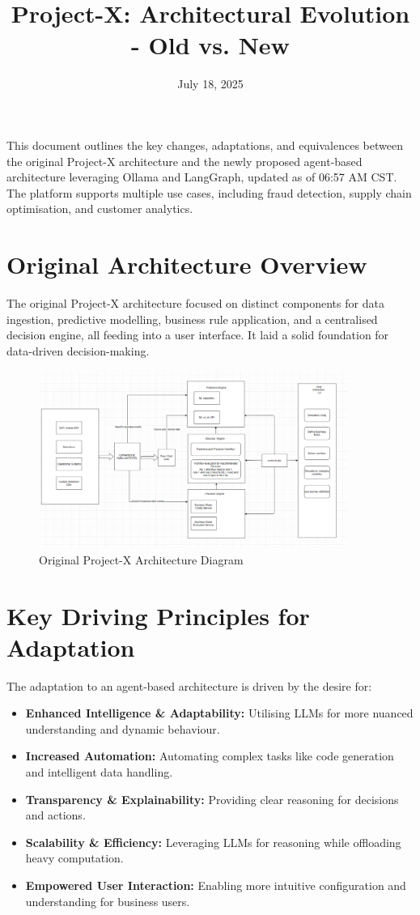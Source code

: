 \documentclass{article}
\title{Project-X: Architectural Evolution - Old vs. New}
\author{}
\date{July 18, 2025}
\begin{document}
\maketitle

This document outlines the key changes, adaptations, and equivalences between the original Project-X architecture and the newly proposed agent-based architecture leveraging Ollama and LangGraph, updated as of 06:57 AM CST. The platform supports multiple use cases, including fraud detection, supply chain optimisation, and customer analytics.

\section{Original Architecture Overview}
The original Project-X architecture focused on distinct components for data ingestion, predictive modelling, business rule application, and a centralised decision engine, all feeding into a user interface. It laid a solid foundation for data-driven decision-making.

\begin{figure}[H]
    \centering
    \includegraphics[width=0.9\textwidth]{ProjectX Architecture.png}
    \caption{Original Project-X Architecture Diagram}
    \label{fig:old_architecture}
\end{figure}

\section{Key Driving Principles for Adaptation}
The adaptation to an agent-based architecture is driven by the desire for:
\begin{itemize}
    \item \textbf{Enhanced Intelligence \& Adaptability:} Utilising LLMs for more nuanced understanding and dynamic behaviour.
    \item \textbf{Increased Automation:} Automating complex tasks like code generation and intelligent data handling.
    \item \textbf{Transparency \& Explainability:} Providing clear reasoning for decisions and actions.
    \item \textbf{Scalability \& Efficiency:} Leveraging LLMs for reasoning while offloading heavy computation.
    \item \textbf{Empowered User Interaction:} Enabling more intuitive configuration and understanding for business users.
\end{itemize}
\end{document}
